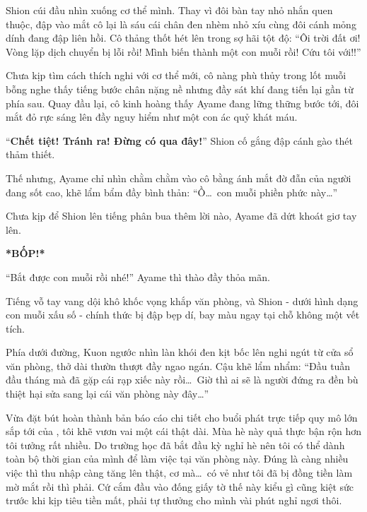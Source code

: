 \documentclass[../main.tex]{subfiles}
\begin{document}
Shion cúi đầu nhìn xuống cơ thể mình. Thay vì đôi bàn tay nhỏ nhắn quen thuộc, đập vào mắt cô lại là sáu cái chân đen nhèm nhỏ xíu cùng đôi cánh mỏng dính đang đập liên hồi. Cô thảng thốt hét lên trong sợ hãi tột độ: ``Ôi trời đất ơi! Vòng lặp dịch chuyển bị lỗi rồi! Mình biến thành một con muỗi rồi! Cứu tôi với!!''

Chưa kịp tìm cách thích nghi với cơ thể mới, cô nàng phù thủy trong lốt muỗi bỗng nghe thấy tiếng bước chân nặng nề nhưng đầy sát khí đang tiến lại gần từ phía sau. Quay đầu lại, cô kinh hoàng thấy Ayame đang lững thững bước tới, đôi mắt đỏ rực sáng lên đầy nguy hiểm như một con ác quỷ khát máu.

``\textbf{Chết tiệt! Tránh ra! Đừng có qua đây!}'' Shion cố gắng đập cánh gào thét thảm thiết.

Thế nhưng, Ayame chỉ nhìn chằm chằm vào cô bằng ánh mắt đờ đẫn của người đang sốt cao, khẽ lẩm bẩm đầy bình thản: ``Ồ\dots\ con muỗi phiền phức này\dots''


Chưa kịp để Shion lên tiếng phân bua thêm lời nào, Ayame đã dứt khoát giơ tay lên.

\textbf{*BỐP!*}

``Bắt được con muỗi rồi nhé!'' Ayame thì thào đầy thỏa mãn.

Tiếng vỗ tay vang dội khô khốc vọng khắp văn phòng, và Shion - dưới hình dạng con muỗi xấu số - chính thức bị đập bẹp dí, bay màu ngay tại chỗ không một vết tích.

Phía dưới đường, Kuon ngước nhìn làn khói đen kịt bốc lên nghi ngút từ cửa sổ văn phòng, thở dài thườn thượt đầy ngao ngán. Cậu khẽ lẩm nhẩm: ``Đầu tuần đầu tháng mà đã gặp cái rạp xiếc này rồi\dots\ Giờ thì ai sẽ là người đứng ra đền bù thiệt hại sửa sang lại cái văn phòng này đây\dots''

\omk
{}

Vừa đặt bút hoàn thành bản báo cáo chi tiết cho buổi phát trực tiếp quy mô lớn sắp tới của \hll, tôi khẽ vươn vai một cái thật dài. Mùa hè này quả thực bận rộn hơn tôi tưởng rất nhiều. Do trường học đã bắt đầu kỳ nghỉ hè nên tôi có thể dành toàn bộ thời gian của mình để làm việc tại văn phòng này. Đúng là càng nhiều việc thì thu nhập càng tăng lên thật, cơ mà\dots\ có vẻ như tôi đã bị đồng tiền làm mờ mắt rồi thì phải. Cứ cắm đầu vào đống giấy tờ thế này kiểu gì cũng kiệt sức trước khi kịp tiêu tiền mất, phải tự thưởng cho mình vài phút nghỉ ngơi thôi.
\end{document}
